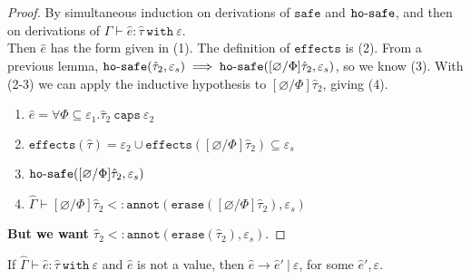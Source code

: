 \documentclass{llncs}
\newcommand{\keywadj}[1]{\mathtt{#1}}
\newcommand{\keyw}[1]{\keywadj{#1}~}
\newcommand{\kw}[1]{\keyw{ #1 }}
\newcommand{\kwa}[1]{\keywadj{ #1 }}
\newcommand{\hyphen}{\hbox{-}}
\newcommand{\fx}[1]{ \kwa{effects}(#1) }
\newcommand{\hosafe}[2]{ \kwa{ho \hyphen safe}(#1, #2) }
\newcommand{\annot}[2]{
	\keywadj{annot}(#1, #2)
}
\newcommand{\erase}[1]{
	\keywadj{erase}(#1)
}
\begin{document}
\begin{proof} By simultaneous induction on derivations of $\kwa{safe}$ and $\kwa{ho \hyphen safe}$, and then on derivations of $\hat \Gamma \vdash \hat e: \hat \tau~\kw{with} \varepsilon$.\\

 Then $\hat e$ has the form given in (1). The definition of $\kwa{effects}$ is (2). From a previous lemma, $\hosafe{\hat \tau_2}{\varepsilon_s} \implies \hosafe{[\varnothing/\Phi]\hat \tau_2}{\varepsilon_s}$, so we know (3). With (2-3) we can apply the inductive hypothesis to $[\varnothing/\Phi]\hat \tau_2$, giving (4).
\begin{enumerate}
	\item $\hat e = \forall \Phi \subseteq \varepsilon_1. \hat \tau_2~\kw{caps} \varepsilon_2$
	\item $\fx{\hat \tau} = \varepsilon_2 \cup \fx{[\varnothing/\Phi]\hat \tau_2} \subseteq \varepsilon_s$
	\item $\hosafe{[\varnothing/\Phi]\hat \tau_2}{\varepsilon_s}$
	\item $\hat \Gamma \vdash [\varnothing/\Phi]\hat \tau_2 <: \annot{\erase{[\varnothing/\Phi]\hat \tau_2}}{\varepsilon_s}$
\end{enumerate} 

\noindent

\textbf{But we want $\hat \tau_2 <: \annot{\erase{\hat \tau_2}}{\varepsilon_s}$}.

\end{proof}

\hrulefill


\begin{theorem}[Progress]
If $\hat \Gamma \vdash \hat e: \hat \tau~\kw{with} \varepsilon$ and $\hat e$ is not a value, then $\hat e \longrightarrow \hat e'~|~\varepsilon$, for some $\hat e', \varepsilon$.
\end{theorem}
\end{document}
